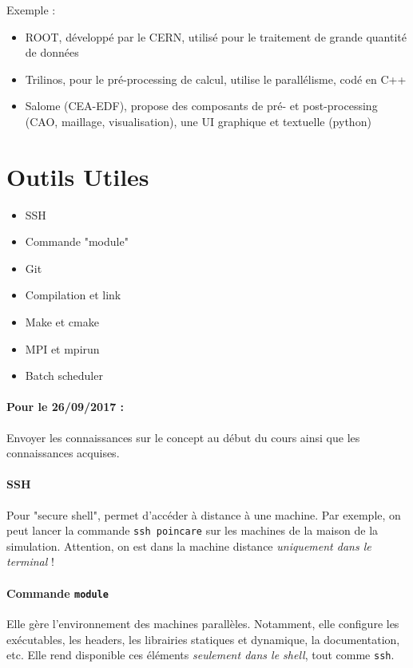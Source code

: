 \documentclass{article}
\begin{document}
Exemple : 
\begin{itemize}
\item ROOT, développé par le CERN, utilisé pour le traitement de grande quantité de données
\item Trilinos, pour le pré-processing de calcul, utilise le parallélisme, codé en C++
\item Salome (CEA-EDF), propose des composants de pré- et post-processing (CAO, maillage, visualisation), une UI graphique et textuelle (python) 
\end{itemize}

\section{Outils Utiles}
\begin{itemize}[label=\textbullet]
\item SSH
\item Commande "module"
\item Git
\item Compilation et link
\item Make et cmake
\item MPI et mpirun
\item Batch scheduler
\end{itemize}

\paragraph{Pour le 26/09/2017 :} Envoyer les connaissances sur le concept au début du cours ainsi que les connaissances acquises.

\paragraph{SSH}
Pour "secure shell", permet d'accéder à distance à une machine. Par exemple, on peut lancer la commande \texttt{ssh poincare} sur les machines de la maison de la simulation. Attention, on est dans la machine distance \emph{uniquement dans le terminal} !

\paragraph{Commande \texttt{module}} Elle gère l'environnement des machines parallèles. Notamment, elle configure les exécutables, les headers, les librairies statiques et dynamique, la documentation, etc. Elle rend disponible ces éléments \emph{seulement dans le shell}, tout comme \texttt{ssh}.
\end{document}
